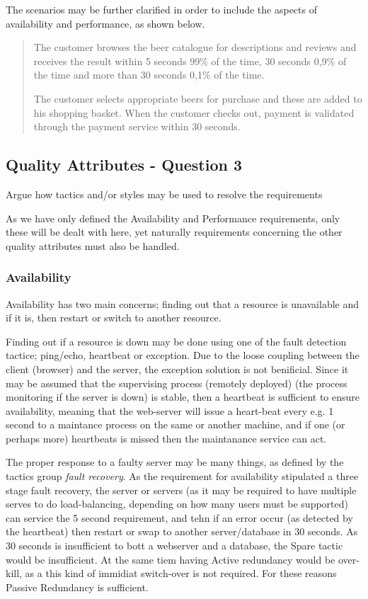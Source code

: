 The scenarios may be further clarified in order to include the aspects of availability and performance, as shown below. 

\begin{quote}
The customer browses the beer catalogue for descriptions and reviews and receives the result within 5 seconds 99\% of the time, 30 seconds 0,9\% of the time and more than 30 seconds 0,1\% of the time. 

The customer selects appropriate beers for purchase and these are added to his shopping basket. When the customer checks out, payment is validated through the payment service within 30 seconds.
\end{quote}


\subsection{Quality Attributes - Question 3}

\begin{question}
Argue how tactics and/or styles may be used to resolve the requirements
\end{question}

As we have only defined the Availability and Performance requirements, only these will be dealt with here, yet naturally requirements concerning the other quality attributes must also be handled.

\subsubsection{Availability}
Availability has two main concerns; finding out that a resource is unavailable and if it is, then restart or switch to another resource. 

Finding out if a resource is down may be done using one of the fault detection tactice; ping/echo, heartbeat or exception. Due to the loose coupling between the client (browser) and the server, the exception solution is not benificial. Since it may be assumed that the supervising process (remotely deployed) (the process monitoring if the server is down) is stable, then a heartbeat is sufficient to ensure availability, meaning that the web-server will issue a heart-beat every e.g. 1 second to a maintance process on the same or another machine, and if one (or perhaps more) heartbeats is missed then the maintanance service can act.

The proper response to a faulty server may be many things, as defined by the tactics group \emph{fault recovery}. As the requirement for availability stipulated a three stage fault recovery, the server or servers (as it may be required to have multiple serves to do load-balancing, depending on how many users must be supported) can service the 5 second requirement, and tehn if an error occur (as detected by the heartbeat) then restart or swap to another server/database in 30 seconds. As 30 seconds is insufficient to bott a webserver and a database, the Spare tactic would be insufficient. At the same tiem having Active redundancy would be over-kill, as a this kind of immidiat switch-over is not required. For these reasons Passive Redundancy is sufficient.

